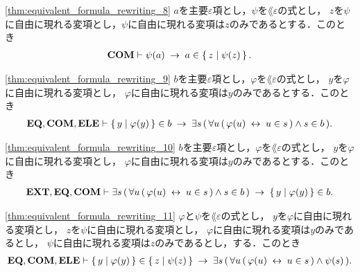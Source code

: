	\begin{screen}
		\begin{thm}
		\ref{thm:equivalent_formula_rewriting_8}
			$a$を主要$\varepsilon$項とし，$\psi$を$\lang{\varepsilon}$の式とし，
			$z$を$\psi$に自由に現れる変項とし，$\psi$に自由に現れる変項は$z$のみであるとする．このとき
			\begin{align}
				\mbox{\bf COM} \vdash \psi(a) \hspace{0.25em}\rightarrow\hspace{0.25em} a \in \left\{\, z \mid \psi(z)\, \right\}.
			\end{align}
		\end{thm}
	\end{screen}
	
	\begin{screen}
		\begin{thm}
		\ref{thm:equivalent_formula_rewriting_9}
			$b$を主要$\varepsilon$項とし，$\varphi$を$\lang{\varepsilon}$の式とし，
			$y$を$\varphi$に自由に現れる変項とし，
			$\varphi$に自由に現れる変項は$y$のみであるとする．このとき
			\begin{align}
				\mbox{{\bf EQ}},\mbox{\bf COM},\mbox{{\bf ELE}} \vdash \left\{\, y \mid \varphi(y)\, \right\} \in b
				\hspace{0.25em}\rightarrow\hspace{0.25em} \exists s\, (\, 
				\forall u\, (\, \varphi(u) \hspace{0.25em}\leftrightarrow\hspace{0.25em} u \in s\, )
				\wedge s \in b\, ).
			\end{align}
		\end{thm}
	\end{screen}
	
	\begin{screen}
		\begin{thm}
		\ref{thm:equivalent_formula_rewriting_10}
			$b$を主要$\varepsilon$項とし，$\varphi$を$\lang{\varepsilon}$の式とし，
			$y$を$\varphi$に自由に現れる変項とし，
			$\varphi$に自由に現れる変項は$y$のみであるとする．このとき
			\begin{align}
				\mbox{{\bf EXT}},\mbox{{\bf EQ}},\mbox{\bf COM} \vdash \exists s\, (\, \forall u\, (\, \varphi(u) \hspace{0.25em}\leftrightarrow\hspace{0.25em} u \in s\, ) \wedge s \in b\, ) \hspace{0.25em}\rightarrow\hspace{0.25em} \left\{\, y \mid \varphi(y)\, \right\} \in b.
			\end{align}
		\end{thm}
	\end{screen}
	
	\begin{screen}
		\begin{thm}
		\ref{thm:equivalent_formula_rewriting_11}
			$\varphi$と$\psi$を$\lang{\varepsilon}$の式とし，
			$y$を$\varphi$に自由に現れる変項とし，
			$z$を$\psi$に自由に現れる変項とし，
			$\varphi$に自由に現れる変項は$y$のみであるとし，
			$\psi$に自由に現れる変項は$z$のみであるとし，する．このとき
			\begin{align}
				\mbox{{\bf EQ}},\mbox{\bf COM},\mbox{{\bf ELE}} \vdash \left\{\, y \mid \varphi(y)\, \right\} \in \left\{\, z \mid \psi(z)\, \right\}
				\hspace{0.25em}\rightarrow\hspace{0.25em} \exists s\, (\, 
				\forall u\, (\, \varphi(u) \hspace{0.25em}\leftrightarrow\hspace{0.25em} u \in s\, )
				\wedge \psi(s)\, ).
			\end{align}
		\end{thm}
	\end{screen}
	
